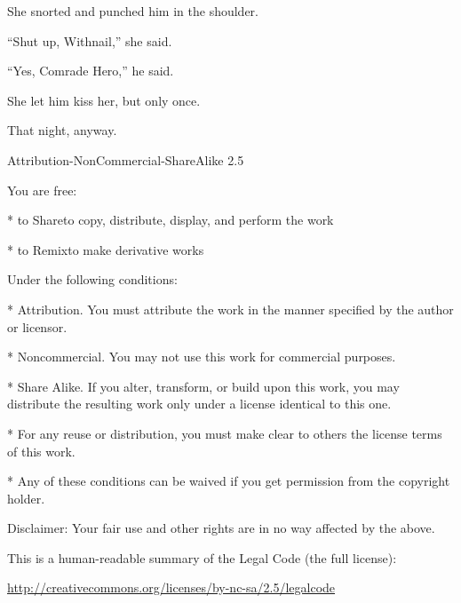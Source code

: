 She snorted and punched him in the shoulder.

“Shut up, Withnail,” she said.

“Yes, Comrade Hero,” he said.

She let him kiss her, but only once.

That night, anyway.



Attribution-NonCommercial-ShareAlike 2.5

You are free:

* to Share\dash{}to copy, distribute, display, and perform the work

* to Remix\dash{}to make derivative works

Under the following conditions:

* Attribution. You must attribute the work in the manner specified
by the author or licensor.

* Noncommercial. You may not use this work for commercial
purposes.

* Share Alike. If you alter, transform, or build upon this work,
you may distribute the resulting work only under a license
identical to this one.



* For any reuse or distribution, you must make clear to others the
license terms of this work.

* Any of these conditions can be waived if you get permission from
the copyright holder.

Disclaimer: Your fair use and other rights are in no way affected
by the above.

This is a human-readable summary of the Legal Code (the full
license):

\url{http://creativecommons.org/licenses/by-nc-sa/2.5/legalcode}


